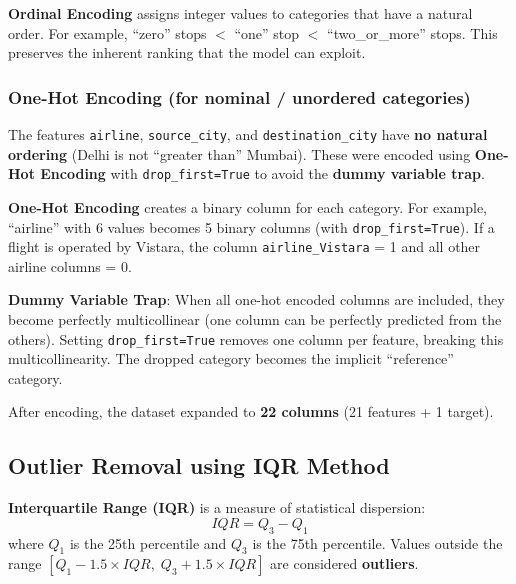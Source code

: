 \documentclass[12pt, a4paper]{article}
\begin{document}
\begin{keyterm}
\textbf{Ordinal Encoding} assigns integer values to categories that have a natural order. For example, ``zero'' stops $<$ ``one'' stop $<$ ``two\_or\_more'' stops. This preserves the inherent ranking that the model can exploit.
\end{keyterm}

\subsubsection{One-Hot Encoding (for nominal / unordered categories)}

The features \texttt{airline}, \texttt{source\_city}, and \texttt{destination\_city} have \textbf{no natural ordering} (Delhi is not ``greater than'' Mumbai). These were encoded using \textbf{One-Hot Encoding} with \texttt{drop\_first=True} to avoid the \textbf{dummy variable trap}.

\begin{keyterm}
\textbf{One-Hot Encoding} creates a binary column for each category. For example, ``airline'' with 6 values becomes 5 binary columns (with \texttt{drop\_first=True}). If a flight is operated by Vistara, the column \texttt{airline\_Vistara} = 1 and all other airline columns = 0.
\end{keyterm}

\begin{keyterm}
\textbf{Dummy Variable Trap}: When all one-hot encoded columns are included, they become perfectly multicollinear (one column can be perfectly predicted from the others). Setting \texttt{drop\_first=True} removes one column per feature, breaking this multicollinearity. The dropped category becomes the implicit ``reference'' category.
\end{keyterm}

After encoding, the dataset expanded to \textbf{22 columns} (21 features + 1 target).

\subsection{Outlier Removal using IQR Method}

\begin{keyterm}
\textbf{Interquartile Range (IQR)} is a measure of statistical dispersion:
\[
    IQR = Q_3 - Q_1
\]
where $Q_1$ is the 25th percentile and $Q_3$ is the 75th percentile. Values outside the range $[Q_1 - 1.5 \times IQR, \; Q_3 + 1.5 \times IQR]$ are considered \textbf{outliers}.
\end{keyterm}
\end{document}
